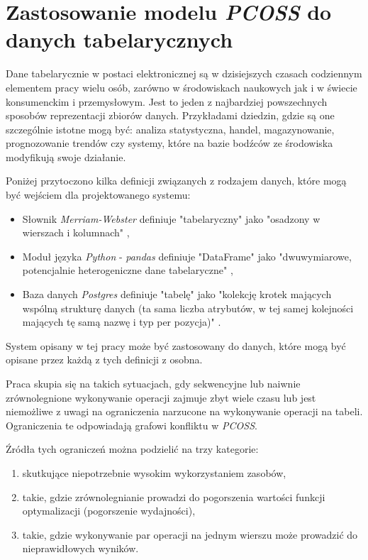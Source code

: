 \documentclass[brudnopis]{xmgr}
\begin{document}
\chapter{Zastosowanie modelu \emph{PCOSS} do danych tabelarycznych}

Dane tabelarycznie w postaci elektronicznej są w dzisiejszych czasach codziennym elementem pracy wielu osób, zarówno w środowiskach naukowych jak i w świecie konsumenckim i przemysłowym. Jest to jeden z najbardziej powszechnych sposobów reprezentacji zbiorów danych. Przykładami dziedzin, gdzie są one szczególnie istotne mogą być: analiza statystyczna, handel, magazynowanie, prognozowanie trendów czy systemy, które na bazie bodźców ze środowiska modyfikują swoje działanie.
\medskip

Poniżej przytoczono kilka definicji związanych z rodzajem danych, które mogą być wejściem dla projektowanego systemu:
\begin{itemize}
    \item Słownik \emph{Merriam-Webster} definiuje "tabelaryczny" jako "osadzony w wierszach i kolumnach" \cite{MW:TAB},
    \item Moduł języka \emph{Python} - \emph{pandas} definiuje "DataFrame" jako "dwuwymiarowe, potencjalnie heterogeniczne dane tabelaryczne" \cite{P:DF},
    \item Baza danych \emph{Postgres} definiuje "tabelę" jako "kolekcję krotek mających wspólną strukturę danych (ta sama liczba atrybutów, w tej samej kolejności mających tę samą nazwę i typ per pozycja)" \cite{PSQL:TAB}.
\end{itemize}
\medskip

System opisany w tej pracy może być zastosowany do danych, które mogą być opisane przez każdą z tych definicji z osobna.

Praca skupia się na takich sytuacjach, gdy sekwencyjne lub naiwnie zrównolegnione wykonywanie operacji zajmuje zbyt wiele czasu lub jest niemożliwe z uwagi na ograniczenia narzucone na wykonywanie operacji na tabeli.
Ograniczenia te odpowiadają grafowi konfliktu w \emph{PCOSS}.
\medskip

Źródła tych ograniczeń można podzielić na trzy kategorie:
\begin{enumerate}
    \item skutkujące niepotrzebnie wysokim wykorzystaniem zasobów,
    \item takie, gdzie zrównolegnianie prowadzi do pogorszenia wartości funkcji optymalizacji (pogorszenie wydajności),
    \item takie, gdzie wykonywanie par operacji na jednym wierszu może prowadzić do nieprawidłowych wyników.
\end{enumerate}
\medskip
\end{document}
